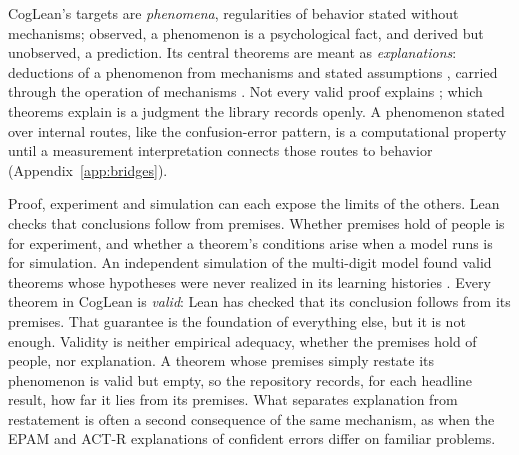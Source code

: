 \documentclass[11pt]{article}
\begin{document}
CogLean's targets are \emph{phenomena}, regularities of behavior stated
without mechanisms; observed, a phenomenon is a psychological fact,
and derived but unobserved, a prediction. Its central theorems are
meant as \emph{explanations}: deductions of a phenomenon from
mechanisms and stated assumptions \citep{hempel1948}, carried through
the operation of mechanisms \citep{machamer2000}. Not every valid
proof explains \citep{steiner1978}; which theorems explain is a
judgment the library records openly. A phenomenon stated over internal
routes, like the confusion-error pattern, is a computational property
until a measurement interpretation connects those routes to behavior
(Appendix~\ref{app:bridges}).

Proof, experiment and simulation can each expose the limits of the
others. Lean checks that conclusions follow from premises. Whether
premises hold of people is for experiment, and whether a theorem's
conditions arise when a model runs is for simulation. An independent
simulation of the multi-digit model found valid theorems whose
hypotheses were never realized in its learning histories
\citep{coglean}. Every theorem in CogLean is \emph{valid}: Lean has
checked that its conclusion follows from its premises. That guarantee
is the foundation of everything else, but it is not enough. Validity
is neither empirical adequacy, whether the premises hold of people,
nor explanation. A theorem whose premises simply restate its
phenomenon is valid but empty, so the repository records, for each
headline result, how far it lies from its premises. What separates
explanation from restatement is often a second consequence of the same
mechanism, as when the EPAM and ACT-R explanations of confident errors
differ on familiar problems.
\end{document}
